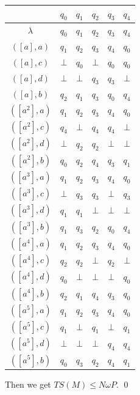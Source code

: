 \documentclass[a4paper,12pt,numbers=noenddot]{scrreport}
\begin{document}
\begin{center}
    \begin{tabular}{ c | c c c c c }
        ~               & $q_0$         & $q_1$       & $q_2$       & $q_3$       & $q_4$\\
        \hline
        $\lambda$         & $q_0$         & $q_1$       & $q_2$       & $q_3$       & $q_4$ \\
        $([a], a)$      & $q_1$         & $q_2$       & $q_3$       & $q_4$       & $q_0$ \\
        $([a], c)$      & $\bot$        & $q_0$       & $\bot$      & $q_0$       & $q_0$ \\
        $([a], d)$      & $\bot$        & $\bot$      & $q_3$       & $q_3$       & $\bot$ \\
        $([a], b)$      & $q_2$          & $q_1$        & $q_3$        & $q_0$          & $q_4$ \\
        $([a^2], a)$    & $q_1$        & $q_2$        & $q_3$        & $q_4$        & $q_0$ \\
        $([a^2], c)$    & $q_4$        & $\bot$        & $q_4$        & $q_4$        & $\bot$ \\
        $([a^2], d)$    & $\bot$        & $q_2$        & $q_2$        & $\bot$        & $\bot$ \\
        $([a^2], b)$      & $q_0$          & $q_2$        & $q_4$        & $q_3$          & $q_1$ \\
        $([a^3], a)$    & $q_1$        & $q_2$        & $q_3$        & $q_4$        & $q_0$ \\
        $([a^3], c)$    & $\bot$        & $q_3$        & $q_3$        & $\bot$        & $q_3$ \\
        $([a^3], d)$    & $q_1$        & $q_1$        & $\bot$        & $\bot$        & $\bot$ \\
        $([a^3], b)$      & $q_1$          & $q_3$        & $q_2$        & $q_0$          & $q_4$ \\
        $([a^4], a)$    & $q_1$        & $q_2$            & $q_3$          & $q_4$      & $q_0$ \\
        $([a^4], c)$    & $q_2$        & $q_2$            & $\bot$          & $q_2$      & $\bot$ \\
        $([a^4], d)$    & $q_0$        & $\bot$           & $\bot$          & $\bot$      & $q_0$ \\
        $([a^4], b)$      & $q_2$          & $q_1$        & $q_4$        & $q_3$          & $q_0$ \\
        $([a^5], a)$    & $q_1$        & $q_2$            & $q_3$          & $q_4$      & $q_0$ \\
        $([a^5], c)$    & $q_1$        & $\bot$            & $q_1$          & $\bot$     & $q_1$ \\
        $([a^5], d)$    & $\bot$        & $\bot$           & $\bot$         & $q_4$      & $q_4$ \\
        $([a^5], b)$      & $q_0$          & $q_3$        & $q_2$        & $q_4$          & $q_1$ \\
    \end{tabular}
\end{center}
Then we get $TS(M) \leq N\omega P $.
\qed
\end{document}
